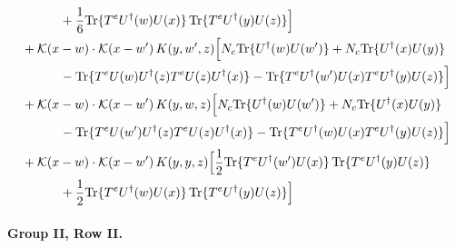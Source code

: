 \documentclass[10pt]{article}
\numberwithin{equation}{section}
\begin{document}
\begin{align}
&\quad\quad\quad+\frac{1}{6}{\rm Tr}\{T^eU^\dagger(w)U(x)\}\,{\rm Tr}\{T^eU^\dagger(y)U(z)\}\Big]\notag\\
&+\mathcal K(x-w)\cdot\mathcal K(x-w')\,K(y,w',z)\Big[N_c{\rm Tr}\{U^\dagger(w)U(w')\}+N_c{\rm Tr}\{U^\dagger(x)U(y)\}\notag\\
&\quad\quad\quad-{\rm Tr}\{T^eU(w)U^\dagger(z)T^eU(z)U^\dagger(x)\}-{\rm Tr}\{T^eU^\dagger(w')U(x)T^eU^\dagger(y)U(z)\}\Big]\notag\\
&+\mathcal K(x-w)\cdot\mathcal K(x-w')\,K(y,w,z)\Big[N_c{\rm Tr}\{U^\dagger(w)U(w')\}+N_c{\rm Tr}\{U^\dagger(x)U(y)\}\notag\\
&\quad\quad\quad-{\rm Tr}\{T^eU(w')U^\dagger(z)T^eU(z)U^\dagger(x)\}-{\rm Tr}\{T^eU^\dagger(w)U(x)T^eU^\dagger(y)U(z)\}\Big]\notag\\
&+\mathcal K(x-w)\cdot\mathcal K(x-w')\,K(y,y,z)\Big[\frac{1}{2}{\rm Tr}\{T^eU^\dagger(w')U(x)\}\,{\rm Tr}\{T^eU^\dagger(y)U(z)\}\notag\\
&\quad\quad\quad+\frac{1}{2}{\rm Tr}\{T^eU^\dagger(w)U(x)\}\,{\rm Tr}\{T^eU^\dagger(y)U(z)\}\Big]
\label{eq:G2I}
\end{align}

\paragraph{Group II, Row II.}
\end{document}
